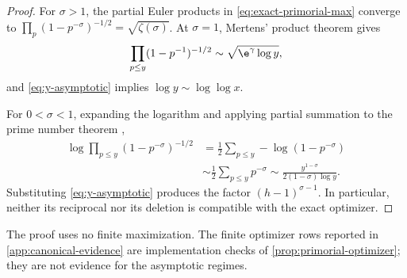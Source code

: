 \begin{proof}
For $\sigma>1$, the partial Euler products in
\cref{eq:exact-primorial-max} converge to
$\prod_p(1-p^{-\sigma})^{-1/2}=\sqrt{\zeta(\sigma)}$.
At $\sigma=1$, Mertens' product theorem
\cite[Thm.~2.7(e), p.~50]{MontgomeryVaughan2006} gives
\[
  \prod_{p\le y}(1-p^{-1})^{-1/2}
    \sim\sqrt{\e^\gamma\log y},
\]
and \cref{eq:y-asymptotic} implies $\log y\sim\log\log x$.

For $0<\sigma<1$, expanding the logarithm and applying partial summation to
the prime number theorem \cite[Thm.~6.9, p.~179]{MontgomeryVaughan2006},
\begin{align*}
  \log\prod_{p\le y}(1-p^{-\sigma})^{-1/2}
    &=\frac12\sum_{p\le y}-\log(1-p^{-\sigma})\\
    &\sim \frac12\sum_{p\le y}p^{-\sigma}
     \sim\frac{y^{1-\sigma}}{2(1-\sigma)\log y}.
\end{align*}
Substituting \cref{eq:y-asymptotic} produces the factor
$(h-1)^{\sigma-1}$.  In particular, neither its reciprocal nor its
deletion is compatible with the exact optimizer.
\end{proof}

The proof uses no finite maximization.  The finite optimizer rows reported in
\cref{app:canonical-evidence} are implementation checks of
\cref{prop:primorial-optimizer}; they are not evidence for the asymptotic
regimes.
